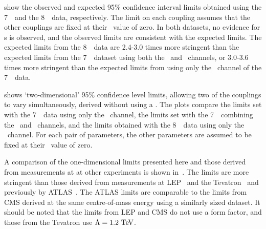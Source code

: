  show the observed and
expected 95\% confidence interval limits obtained using the 7~\tev\ and the
8~\tev\ data, respectively. The limit on each coupling assumes that the other
couplings are fixed at their \sm\ value of zero. In both datasets, no evidence
for \TGC s is observed, and the observed limits are consistent with the expected
limits. The expected limits from the 8~\tev\ data are 2.4-3.0 times more
stringent than the expected limits from the 7~\tev\ dataset using both the
\ZZllll\ and \ZZllvv\ channels, or 3.0-3.6 times more stringent than the
expected limits from using only the \ZZllll\ channel of the 7~\tev\ data.

 shows `two-dimensional' 95\% confidence level limits,
allowing two of the couplings to vary simultaneously, derived without using a
\formfactor. The plots compare the limits set with the 7~\tev\ data using only
the \ZZllll\ channel, the limits set with the 7~\tev\ combining the \ZZllll\ and
\ZZllvv\ channels, and the limits obtained with the 8~\tev\ data using only the
\ZZllll\ channel. For each pair of parameters, the other parameters are assumed to be
fixed at their \sm\ value of zero. 


A comparison of the one-dimensional limits presented here and those derived from measurements at
at other experiments is shown in~. The
limits are more stringent than those derived from measurements at
LEP~\cite{bib:LEPEW2006} and the Tevatron~\cite{Abazov:2007ad} and previously by
ATLAS~\cite{ATLAS_ZZ4l:1fb2011}. The ATLAS  limits are comparable to
the limits from CMS derived at the same centre-of-mass energy using a similarly
sized dataset. It should be noted that the limits from LEP and CMS do not use a
form factor, and those from the Tevatron use $\Lambda = 1.2\TeV$.

